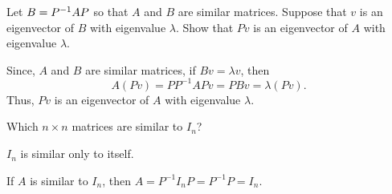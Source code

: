 \documentclass{ximera}
\begin{document}
\begin{exercise} \label{c6.5.4}
Let $B=P^{-1} AP$ so that $A$ and $B$ are similar matrices.  Suppose
that $v$ is an eigenvector of $B$ with eigenvalue $\lambda$.  Show
that $Pv$ is an eigenvector of $A$ with eigenvalue $\lambda$.

\begin{solution}

Since, $A$ and $B$ are similar matrices, if $Bv = \lambda v$, then
\[ A(Pv) = PP^{-1}APv = PBv = \lambda (Pv). \]
Thus, $Pv$ is an eigenvector of $A$ with eigenvalue $\lambda$.

\end{solution}
\end{exercise}

\begin{exercise} \label{c6.5.5}
Which $n\times n$ matrices are similar to $I_n$?

\begin{solution}

\ans $I_n$ is similar only to itself.

\soln If $A$ is similar to $I_n$, then $A = P^{-1}I_nP = P^{-1}P = I_n$.

\end{solution}
\end{exercise}
\end{document}
